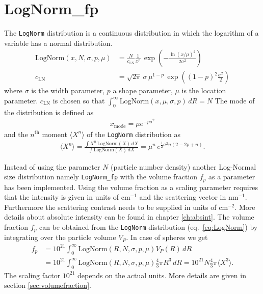 \section{LogNorm\_fp} \hspace{1pt}
\label{sec:sd_lognorm_fp}

The \texttt{LogNorm} distribution is a continuous distribution in which the logarithm of a variable
has a normal distribution.
\begin{subequations}
\begin{align}
\text{LogNorm}(x,N,\sigma,p,\mu) &=  \frac{N}{c_\text{LN}}
                                    \frac{1}{x^{p}}\,
                                    \exp\!\!\left(-\frac{\ln(x/\mu)^2}{2\sigma^2}\right) \\
c_\text{LN} &= \sqrt{2\pi}\,\sigma \,\mu^{1-p}
\,\exp\!\!\left((1-p)^2\frac{\sigma^2}{2}\right)
\label{eq:LogNorm}
\end{align}
\end{subequations}
where $\sigma$ is the width parameter, $p$ a shape parameter, $\mu$ is the location parameter.
$c_\text{LN}$ is chosen so that $\int_0^\infty\! \text{LogNorm}(x,\mu,\sigma,p)\,dR = N$
The mode of the distribution is defined as
\begin{align}
x_\text{mode} = \mu e^{-p \sigma^2}
\end{align}
and the $n^\text{th}$ moment $\langle X^n\rangle$ of the \texttt{LogNorm} distribution as
\begin{align}
\langle X^n\rangle = \frac{\int X^n\, \textrm{LogNorm}(X)\, dX}{\int \textrm{LogNorm}(X)\, dX} =
\mu^n \, e^{\frac{1}{2} \sigma^2 n (2 - 2 p + n)}.
\label{eq:nMoment:LogNorm}
\end{align}

Instead of using the parameter $N$ (particle number density) another
Log-Normal size distribution namely {\tt LogNorm\_fp} with the
volume fraction $f_p$ as a parameter has been implemented.
Using the volume fraction as a scaling parameter requires that the intensity is
given in units of cm$^{-1}$ and the scattering vector in nm$^{-1}$. Furthermore
the scattering contrast needs to be supplied in units of cm$^{-2}$. More details
about absolute intensity can be found in chapter \ref{ch:absint}.
The volume fraction $f_p$ can be obtained from the \texttt{LogNorm}-distribution
(eq.\ \ref{eq:LogNorm}) by integrating over the particle volume $V_P$. In case
of spheres we get
\begin{align}
f_p &= 10^{21} \int_0^\infty \mathrm{LogNorm}(R,N,\sigma,p,\mu) V_P(R) \, dR \label{eq:fpMomentsV} \\
    &= 10^{21} \int_0^\infty \mathrm{LogNorm}(R,N,\sigma,p,\mu) \frac{4}{3}\pi R^3 \, dR = 10^{21}
    N \frac{4}{3}\pi \langle X^3 \rangle .
\end{align}
The scaling factor $10^{21}$ depends on the actual units. More details are
given in section \ref{sec:volumefraction}.


